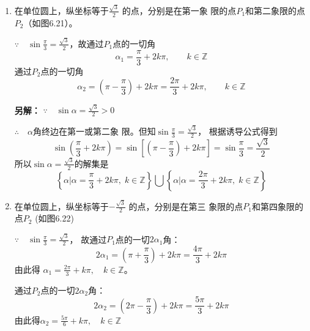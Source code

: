 \begin{solution}
\begin{enumerate}
    \item 在单位圆上，纵坐标等于$\frac{\sqrt{3}}{2}$
    的点，分别是在第一象
    限的点$P_1$和第二象限的点$P_2$（如图6.21）。

$\because\quad \sin\frac{\pi}{3}=\frac{\sqrt{3}}{2}$，故通过$P_1$点的一切角
\[\alpha_1=\frac{\pi}{3}+2k\pi,\qquad k\in\mathbb{Z}\]
通过$P_2$点的一切角
\[\alpha_2=\left(\pi-\frac{\pi}{3}\right)+2k\pi=\frac{2\pi}{3}+2k\pi,\qquad k\in\mathbb{Z}\]

\textbf{另解：}
$\because\quad \sin\alpha=\frac{\sqrt{3}}{2}>0$

$\therefore\quad \alpha$角终边在第一或第二象
限。但知$\sin\frac{\pi}{3}=\frac{\sqrt{3}}{2}$，
根据诱导公式得到
\[\sin\left(\frac{\pi}{3}+2k\pi\right)=\sin\left[\left(\pi-\frac{\pi}{3}\right)+2k\pi\right]=\sin\frac{\pi}{3}=\frac{\sqrt{3}}{2}\]
所以$\sin\alpha=\frac{\sqrt{3}}{2}$的解集是
\[\left\{\alpha\Big|\alpha=\frac{\pi}{3}+2k\pi,\; k\in\mathbb{Z}\right\}\bigcup \left\{\alpha\Big|\alpha=\frac{2\pi}{3}+2k\pi,\; k\in\mathbb{Z}\right\}\]

\item 在单位圆上，纵坐标等于$-\frac{\sqrt{3}}{2}$
的点，分别是在第三
象限的点$P_1$和第四象限的点$P_2$ (如图6.22)

\begin{figure}[htp]
    \centering
{}
    \caption{}
\end{figure}


$\because\quad \sin\frac{\pi}{3}=\frac{\sqrt{3}}{2}$，
故通过$P_1$点的一切$2\alpha_1$角：
\[2\alpha_1=\left(\pi+\frac{\pi}{3}\right)+2k\pi=\frac{4\pi}{3}+2k\pi\]
由此得 $\alpha_1=\frac{2\pi}{3}+k\pi,\quad k\in\mathbb{Z}$。

通过$P_2$点的一切$2\alpha_2$角：
\[2\alpha_2=\left(2\pi-\frac{\pi}{3}\right)+2k\pi=\frac{5\pi}{3}+2k\pi\]
由此得$\alpha_2=\frac{5\pi}{6}+k\pi,\quad k\in\mathbb{Z}$


\end{enumerate}
\end{solution}
